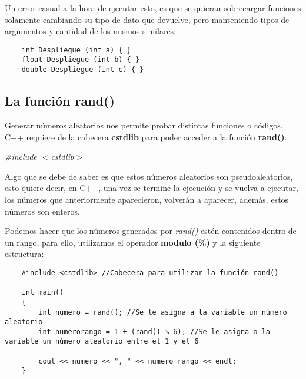 Un error casual a la hora de ejecutar esto, es que se quieran sobrecargar funciones solamente cambiando su tipo de dato que devuelve, pero manteniendo tipos de argumentos y cantidad de los mismos similares.
\begin{lstlisting}
    int Despliegue (int a) { }
    float Despliegue (int b) { }
    double Despliegue (int c) { }
\end{lstlisting}


\subsection{La función rand()}
\hspace{0.55cm}Generar números aleatorios nos permite probar distintas funciones o códigos, C++ requiere de la cabecera \textbf{cstdlib} para poder acceder a la función \textbf{rand()}.
\begin{center}
    \textit{\#include $<$cstdlib$>$}
\end{center}

Algo que se debe de saber es que estos números aleatorios son pseudoaleatorios, esto quiere decir, en C++, una vez se termine la ejecución y se vuelva a ejecutar, los números que anteriormente aparecieron, volverán a aparecer, además. estos números son enteros.

Podemos hacer que los números generados por \textit{rand()} estén contenidos dentro de un rango, para ello, utilizamos el operador \textbf{modulo (\%)} y la siguiente estructura:
\begin{lstlisting}
    #include <cstdlib> //Cabecera para utilizar la función rand()
    
    int main()
    {
        int numero = rand(); //Se le asigna a la variable un número aleatorio
        int numerorango = 1 + (rand() % 6); //Se le asigna a la variable un número aleatorio entre el 1 y el 6
        
        cout << numero << ", " << numero rango << endl;
    }
\end{lstlisting}


